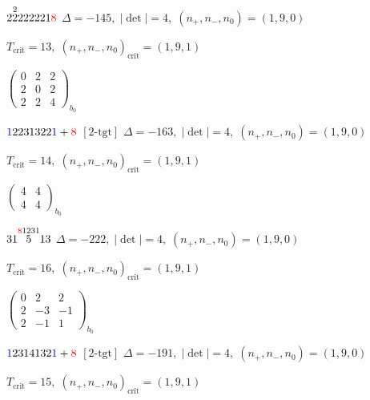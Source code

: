 \documentclass[10pt]{article}
\begin{document}
\smallskip

$2\overset{2}{2}222221\textcolor{red}{8}$ \quad $\Delta=-145,\; |\det|=4,\; (n_+,n_-,n_0)=(1,9,0)$

\hspace{1em}$T_{\text{crit}}=13,\; (n_+,n_-,n_0)_{\text{crit}}=(1,9,1)$

\hspace{2em}$\left(\begin{smallmatrix}0 & 2 & 2 \\ 2 & 0 & 2 \\ 2 & 2 & 4\end{smallmatrix}\right)_{\!b_0}$

\smallskip

$\textcolor{blue}{1}2231322\textcolor{blue}{1}+\textcolor{red}{8}$ $\scriptstyle [2\text{-tgt}]$ \quad $\Delta=-163,\; |\det|=4,\; (n_+,n_-,n_0)=(1,9,0)$

\hspace{1em}$T_{\text{crit}}=14,\; (n_+,n_-,n_0)_{\text{crit}}=(1,9,1)$

\hspace{2em}$\left(\begin{smallmatrix}4 & 4 \\ 4 & 4\end{smallmatrix}\right)_{\!b_0}$

\smallskip

$31\overset{\textcolor{red}{8}1231}{5}13$ \quad $\Delta=-222,\; |\det|=4,\; (n_+,n_-,n_0)=(1,9,0)$

\hspace{1em}$T_{\text{crit}}=16,\; (n_+,n_-,n_0)_{\text{crit}}=(1,9,1)$

\hspace{2em}$\left(\begin{smallmatrix}0 & 2 & 2 \\ 2 & -3 & -1 \\ 2 & -1 & 1\end{smallmatrix}\right)_{\!b_0}$

\smallskip

$\textcolor{blue}{1}2314132\textcolor{blue}{1}+\textcolor{red}{8}$ $\scriptstyle [2\text{-tgt}]$ \quad $\Delta=-191,\; |\det|=4,\; (n_+,n_-,n_0)=(1,9,0)$

\hspace{1em}$T_{\text{crit}}=15,\; (n_+,n_-,n_0)_{\text{crit}}=(1,9,1)$
\end{document}
